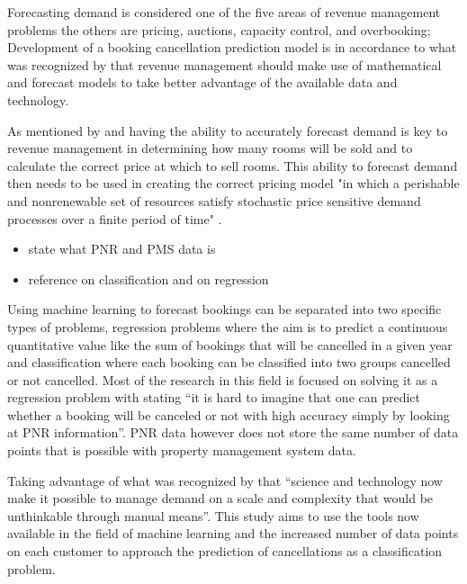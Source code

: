  Forecasting demand is considered one of the five areas of revenue management problems the others are pricing, auctions, capacity control, and overbooking; \cite{Chiang2007AnResearch}  Development of a booking cancellation prediction model is in accordance to what was recognized by \cite{Chiang2007AnResearch} that revenue management should make use of mathematical and forecast models to take better advantage of the available data and technology.
 
\vspace{5mm}

As mentioned by \cite{RevenueWorldCat.org} and \cite{Weatherford2003AManagement} having the ability to accurately forecast demand is key to revenue management in determining how many rooms will be sold and to calculate the correct price at which to sell rooms. This ability to forecast demand then needs to be used in creating the correct pricing model "in which a perishable and nonrenewable set of resources satisfy stochastic price sensitive demand processes over a finite period of time" \cite{Bitran2003AnManagement}.

\vspace{5mm}

\begin{itemize}
\item state what PNR and PMS data is
\item reference on classification and on regression
\end{itemize}


Using machine learning to forecast bookings can be separated into two specific types of problems, regression problems where the aim is to predict a continuous quantitative value like the sum of bookings that will be cancelled in a given year and classification where each booking can be classified into two groups cancelled or not cancelled. Most of the research in this field is focused on solving it as a regression problem with  \cite{RomeroMorales2010ForecastingMining} stating “it is hard to imagine that one can predict whether a booking will be canceled or not with high accuracy simply by looking at PNR information”. PNR data however does not store the same number of data points that is possible with property management system data.

\vspace{5mm}

Taking advantage of what was recognized by \cite{Talluri2004TheManagement} that “science and technology now make it possible to manage demand on a scale and complexity that would be unthinkable through manual means”.  This study aims to use the tools now available in the field of machine learning and the increased number of data points on each customer to approach the prediction of cancellations as a classification problem.   

